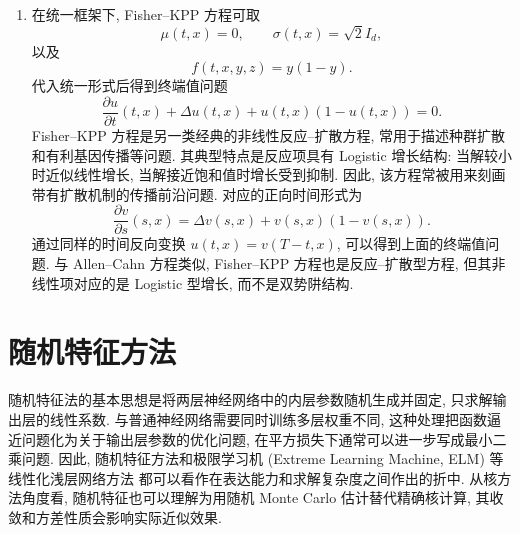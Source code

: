 \begin{enumerate}
        \item
        在统一框架下, Fisher--KPP 方程可取
        \begin{equation*}
          \mu(t, x) = 0,\qquad
          \sigma(t, x) = \sqrt{2} I_{d},
        \end{equation*}
        以及
        \begin{equation*}
          f(t, x, y, z) = y(1 - y).
        \end{equation*}
        代入统一形式后得到终端值问题
        \begin{equation*}
          \frac{\partial u}{\partial t}(t, x)
          + \Delta u(t, x)
          + u(t, x)(1 - u(t, x))
          =0.
        \end{equation*}
        Fisher--KPP 方程是另一类经典的非线性反应--扩散方程, 常用于描述种群扩散和有利基因传播等问题.
        其典型特点是反应项具有 Logistic 增长结构: 当解较小时近似线性增长, 当解接近饱和值时增长受到抑制.
        因此, 该方程常被用来刻画带有扩散机制的传播前沿问题.
        对应的正向时间形式为
        \begin{equation*}
          \frac{\partial v}{\partial s}(s, x) = \Delta v(s, x) + v(s, x)(1 - v(s, x)).
        \end{equation*}
        通过同样的时间反向变换 $u(t, x) = v(T - t, x)$, 可以得到上面的终端值问题.
        与 Allen--Cahn 方程类似, Fisher--KPP 方程也是反应--扩散型方程,
        但其非线性项对应的是 Logistic 型增长, 而不是双势阱结构.
      \end{enumerate}

  \section{随机特征方法}\label{sec:rfm}
    随机特征法的基本思想是将两层神经网络中的内层参数随机生成并固定,
    只求解输出层的线性系数.
    与普通神经网络需要同时训练多层权重不同, 这种处理把函数逼近问题化为关于输出层参数的优化问题,
    在平方损失下通常可以进一步写成最小二乘问题.
    因此, 随机特征方法和极限学习机 (Extreme Learning Machine, ELM) 等线性化浅层网络方法
    都可以看作在表达能力和求解复杂度之间作出的折中\cite{chenBridgingTraditionalMachine2022,wangExtremeLearningMachineBased2023,maoSolvingHighDimensionalPDEs2026}.
    从核方法角度看, 随机特征也可以理解为用随机 Monte Carlo 估计替代精确核计算,
    其收敛和方差性质会影响实际近似效果\cite{reidVarianceReducingCouplingsRandom2024}.

